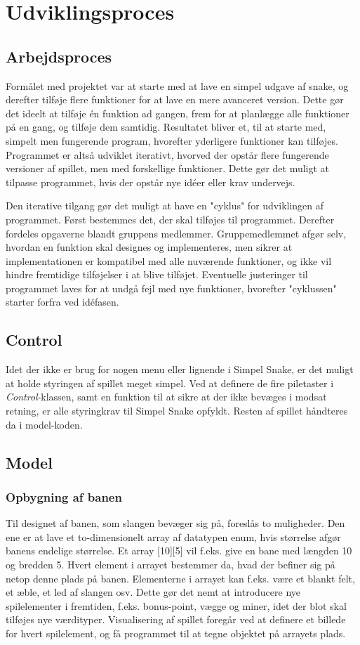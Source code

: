 \documentclass{report}
\begin{document}
\section{Udviklingsproces}
\subsection{Arbejdsproces}
Formålet med projektet var at starte med at lave en simpel udgave af snake, og derefter tilføje flere funktioner for at lave en mere avanceret version. Dette gør det ideelt at tilføje én funktion ad gangen, frem for at planlægge alle funktioner på en gang, og tilføje dem samtidig. Resultatet bliver et, til at starte med, simpelt men fungerende program, hvorefter yderligere funktioner kan tilføjes. Programmet er altså udviklet iterativt, hvorved der opstår flere fungerende versioner af spillet, men med forskellige funktioner. Dette gør det muligt at tilpasse programmet, hvis der opstår nye idéer eller krav undervejs. 

Den iterative tilgang gør det muligt at have en "cyklus" for udviklingen af programmet. Først bestemmes det, der skal tilføjes til programmet. Derefter fordeles opgaverne blandt gruppens medlemmer. Gruppemedlemmet afgør selv, hvordan en funktion skal designes og implementeres, men sikrer at implementationen er kompatibel med alle nuværende funktioner, og ikke vil hindre fremtidige tilføjelser i at blive tilføjet. Eventuelle justeringer til programmet laves for at undgå fejl med nye funktioner, hvorefter "cyklussen" starter forfra ved idéfasen.

\subsection{Control}
Idet der ikke er brug for nogen menu eller lignende i Simpel Snake, er det muligt at holde styringen af spillet meget simpel. Ved at definere de fire piletaster i \textit{Control}-klassen, samt en funktion til at sikre at der ikke bevæges i modsat retning, er alle styringkrav til Simpel Snake opfyldt. Resten af spillet håndteres da i model-koden.

\subsection{Model}
\subsubsection{Opbygning af banen}
Til designet af banen, som slangen bevæger sig på, foreslås to muligheder. Den ene er at lave et to-dimensionelt array af datatypen enum, hvis størrelse afgør banens endelige størrelse. Et array [10][5] vil f.eks. give en bane med længden 10 og bredden 5. Hvert element i arrayet bestemmer da, hvad der befiner sig på netop denne plads på banen. Elementerne i arrayet kan f.eks. være et blankt felt, et æble, et led af slangen osv. Dette gør det nemt at introducere nye spilelementer i fremtiden, f.eks. bonus-point, vægge og miner, idet der blot skal tilføjes nye værdityper. Visualisering af spillet foregår ved at definere et billede for hvert spilelement, og få programmet til at tegne objektet på arrayets plads.
\end{document}
